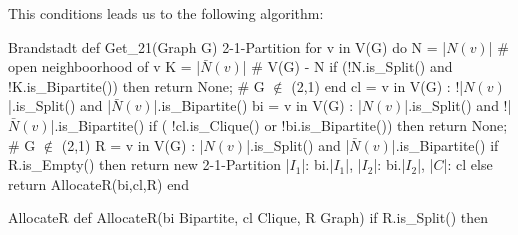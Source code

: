 This conditions leads us to the following algorithm:

\begin{code}{Brandstadt}
  def Get_21(Graph G) 2-1-Partition
    for v in V(G) do
      N = |$N(v)$| # open neighboorhood of v
      K = |$\bar{N}(v)$| # V(G) - N
      if (!N.is_Split() and !K.is_Bipartite()) then
        return None; # G $\notin$ (2,1)
    end
    cl = { v in V(G) : !|$N(v)$|.is_Split() and |$\bar{N}(v)$|.is_Bipartite() }
    bi = { v in V(G) : |$N(v)$|.is_Split() and !|$\bar{N}(v)$|.is_Bipartite() }
    if ( !cl.is_Clique() or !bi.is_Bipartite()) then
      return None; # G $\notin$ (2,1)
    R = {v in V(G) : |$N(v)$|.is_Split() and |$\bar{N}(v)$|.is_Bipartite()}
    if R.is_Empty() then
      return new 2-1-Partition {
        |$I_1$|: bi.|$I_1$|,
        |$I_2$|: bi.|$I_2$|,
        |$C$|: cl
      }
    else return AllocateR(bi,cl,R)
  end
\end{code}

\begin{code}{AllocateR}
  def AllocateR(bi Bipartite, cl Clique, R Graph)
    if R.is_Split() then
\end{code}



